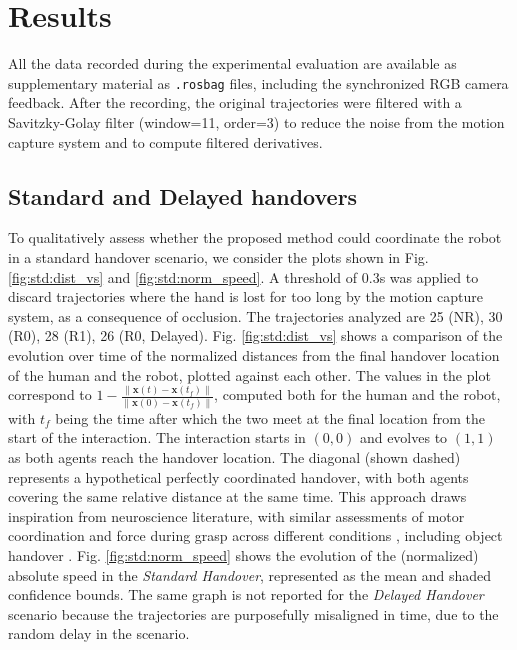 \documentclass[lettersize,journal]{IEEEtran}
\newcommand{\x}{\bm x}
\begin{document}
\section{Results}

\noindent
All the data recorded during the experimental evaluation are available as supplementary material as \texttt{.rosbag} files, including the synchronized RGB camera feedback.
After the recording, the original trajectories were filtered with a Savitzky-Golay filter (window=11, order=3) to reduce the noise from the motion capture system and to compute filtered derivatives.



\subsection{Standard and Delayed handovers}

\noindent
To qualitatively assess whether the proposed method could coordinate the robot in a standard handover scenario, we consider the plots shown in Fig. \ref{fig:std:dist_vs} and \ref{fig:std:norm_speed}.
A threshold of 0.3s was applied to discard trajectories where the hand is lost for too long by the motion capture system, as a consequence of occlusion.
The trajectories analyzed are 25 (NR), 30 (R0), 28 (R1), 26 (R0, Delayed).
Fig. \ref{fig:std:dist_vs} shows a comparison of the evolution over time of the normalized distances from the final handover location of the human and the robot, plotted against each other.
The values in the plot correspond to $1-\frac{\| \x(t) - \x(t_f) \|}{\| \x(0)-\x(t_f) \|} $, computed both for the human and the robot, with $t_f$ being the time after which the two meet at the final location from the start of the interaction.
The interaction starts in $(0,0)$ and evolves to $(1,1)$ as both agents reach the handover location.
The diagonal (shown dashed) represents a hypothetical perfectly coordinated handover, with both agents covering the same relative distance at the same time.
This approach draws inspiration from neuroscience literature, with similar assessments of motor coordination and force during grasp across different conditions \cite{flanagan_coupling_1993} \cite{gordon_fingertip_1999} \cite{cipriani_humans_2014}, including object handover \cite{controzzi_humans_2018}.
Fig. \ref{fig:std:norm_speed} shows the evolution of the (normalized) absolute speed in the \textit{Standard Handover}, represented as the mean and shaded confidence bounds.
The same graph is not reported for the \textit{Delayed Handover} scenario because the trajectories are purposefully misaligned in time, due to the random delay in the scenario.
\end{document}
